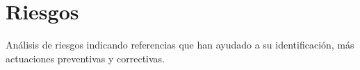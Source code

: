 \section{Riesgos}
\label{sec:risks}

\begin{shaded}
Análisis de riesgos indicando referencias que han ayudado a su identificación, más actuaciones preventivas y correctivas.
\end{shaded}